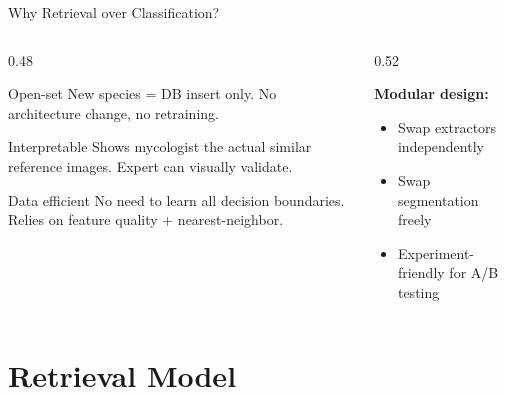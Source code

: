 \documentclass[aspectratio=169]{beamer}
\begin{document}
\begin{frame}{Why Retrieval over Classification?}
  \begin{columns}[T]
    \begin{column}{0.48\textwidth}
      \begin{block}{Open-set}
        New species = DB insert only. No architecture change, no retraining.
      \end{block}
      \begin{block}{Interpretable}
        Shows mycologist the actual similar reference images. Expert can visually validate.
      \end{block}
      \begin{block}{Data efficient}
        No need to learn all decision boundaries. Relies on feature quality + nearest-neighbor.
      \end{block}
    \end{column}
    \begin{column}{0.52\textwidth}
      \begin{center}
      \end{center}
      \textbf{Modular design:}
      \begin{itemize}
        \item Swap extractors independently
        \item Swap segmentation freely
        \item Experiment-friendly for A/B testing
      \end{itemize}
    \end{column}
  \end{columns}
\end{frame}

\section{Retrieval Model}
\end{document}
